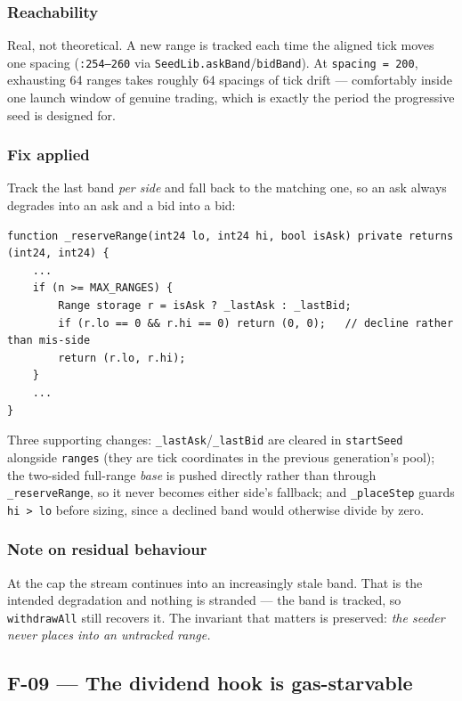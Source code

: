 \documentclass[11pt,a4paper]{article}
\newcommand{\code}[1]{\texttt{\small #1}}
\newcommand{\fileref}[1]{\texttt{\scriptsize #1}}
\begin{document}
\subsubsection*{Reachability}

Real, not theoretical. A new range is tracked each time the aligned tick moves one
spacing (\fileref{:254--260} via \code{SeedLib.askBand}/\code{bidBand}). At
\code{spacing = 200}, exhausting 64 ranges takes roughly 64 spacings of tick drift
--- comfortably inside one launch window of genuine trading, which is exactly the
period the progressive seed is designed for.

\subsubsection*{Fix applied}

Track the last band \emph{per side} and fall back to the matching one, so an ask
always degrades into an ask and a bid into a bid:
\begin{lstlisting}
function _reserveRange(int24 lo, int24 hi, bool isAsk) private returns (int24, int24) {
    ...
    if (n >= MAX_RANGES) {
        Range storage r = isAsk ? _lastAsk : _lastBid;
        if (r.lo == 0 && r.hi == 0) return (0, 0);   // decline rather than mis-side
        return (r.lo, r.hi);
    }
    ...
}
\end{lstlisting}
Three supporting changes: \code{\_lastAsk}/\code{\_lastBid} are cleared in
\code{startSeed} alongside \code{ranges} (they are tick coordinates in the previous
generation's pool); the two-sided full-range \emph{base} is pushed directly rather
than through \code{\_reserveRange}, so it never becomes either side's fallback; and
\code{\_placeStep} guards \code{hi > lo} before sizing, since a declined band would
otherwise divide by zero.

\subsubsection*{Note on residual behaviour}

At the cap the stream continues into an increasingly stale band. That is the
intended degradation and nothing is stranded --- the band is tracked, so
\code{withdrawAll} still recovers it. The invariant that matters is preserved:
\emph{the seeder never places into an untracked range.}

\newpage
\subsection{F-09 --- The dividend hook is gas-starvable}
\end{document}
